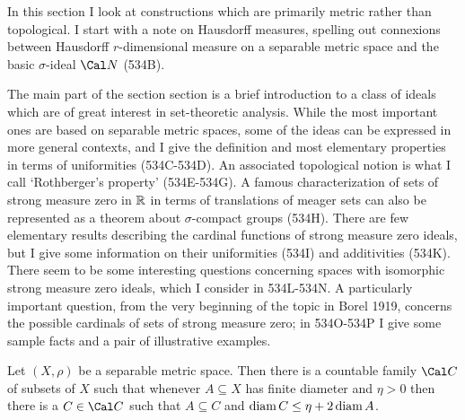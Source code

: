 
\def\chaptername{Topology and measure III}
\def\sectionname{Hausdorff measures and strong measure zero}
\def\czz{ CHECK\query\ }


In this section I look at constructions which are primarily metric
rather than topological.   I start with a note on Hausdorff
measures, spelling out connexions between Hausdorff $r$-dimensional
measure on a
separable metric space and the basic $\sigma$-ideal $\Cal N$ (534B).

The main part of the section section is a brief introduction to a
class of ideals which are of
great interest in set-theoretic analysis.   While the most important
ones are based on separable metric spaces, some of the ideas can be
expressed in more general contexts, and I give the definition and most
elementary properties in terms of uniformities (534C-534D).   An
associated topological notion is what I call `Rothberger's property'
(534E-534G).   %
A famous
characterization of sets of strong measure zero in $\Bbb R$ in terms
of translations of meager sets can also be represented as a theorem about
$\sigma$-compact groups (534H).   There are few elementary results
describing the cardinal functions of strong measure zero ideals, but I
give some information on their uniformities (534I) and additivities
(534K).   There seem to be some interesting questions concerning
spaces with isomorphic strong measure zero ideals, which I consider in
534L-534N.  %
A particularly important question, from the very beginning of the
topic in {\smc Borel 1919}, concerns the possible cardinals of sets of
strong measure zero;  in 534O-534P I give some sample facts and a pair of
illustrative examples.

 Let $(X,\rho)$ be a separable metric space.
Then there is a countable family $\Cal C$ of subsets of $X$ such that
whenever $A\subseteq X$ has finite diameter and $\eta>0$ then there
is a $C\in\Cal C$ such that $A\subseteq C$ and $\mathop{\text{diam}} C\le\eta+2\mathop{\text{diam}} A$.


